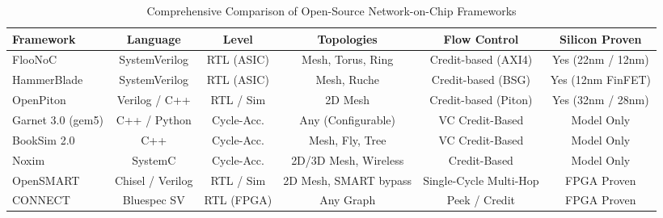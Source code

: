\begin{table}[htbp]
\centering
\caption{Comprehensive Comparison of Open-Source Network-on-Chip Frameworks}
\label{tab:app_frameworks}
\begin{tabular}{lccccc}
\toprule
\textbf{Framework} & \textbf{Language} & \textbf{Level} & \textbf{Topologies} & \textbf{Flow Control} & \textbf{Silicon Proven} \\
\midrule
FlooNoC~\cite{Fischer2025}   & SystemVerilog & RTL (ASIC) & Mesh, Torus, Ring & Credit-based (AXI4) & Yes (22nm / 12nm) \\
HammerBlade~\cite{Gao2026}  & SystemVerilog & RTL (ASIC) & Mesh, Ruche        & Credit-based (BSG)  & Yes (12nm FinFET) \\
OpenPiton                   & Verilog / C++ & RTL / Sim  & 2D Mesh            & Credit-based (Piton)& Yes (32nm / 28nm) \\
Garnet 3.0 (gem5)           & C++ / Python  & Cycle-Acc. & Any (Configurable) & VC Credit-Based     & Model Only \\
BookSim 2.0                 & C++           & Cycle-Acc. & Mesh, Fly, Tree    & VC Credit-Based     & Model Only \\
Noxim                       & SystemC       & Cycle-Acc. & 2D/3D Mesh, Wireless & Credit-Based      & Model Only \\
OpenSMART                   & Chisel / Verilog & RTL / Sim & 2D Mesh, SMART bypass & Single-Cycle Multi-Hop & FPGA Proven \\
CONNECT                     & Bluespec SV   & RTL (FPGA) & Any Graph          & Peek / Credit       & FPGA Proven \\
\bottomrule
\end{tabular}
\end{table}

